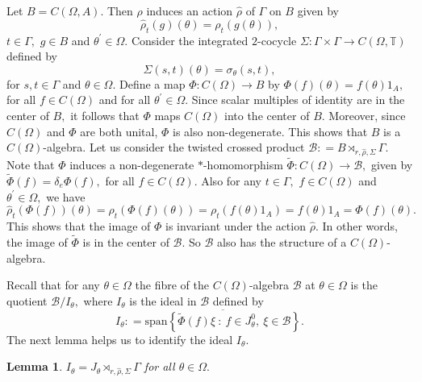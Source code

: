\documentclass[a4paper,11pt,reqno]{amsart}
\theoremstyle{plain}
\newtheorem{lem}[thm]{Lemma}
\theoremstyle{mainthmstyle}
\theoremstyle{named}
\numberwithin{equation}{section}
\begin{document}
Let $B = C (\Omega, A).$ Then $\rho$ induces an action $\hat {\rho}$ of $\Gamma$ on $B$ given by $$\hat {\rho}_t (g) (\theta) = \rho_t (g (\theta)),$$ $t \in \Gamma,$ $g \in B$ and $\theta^{\prime} \in \Omega.$ Consider the integrated $2$-cocycle $\Sigma : \Gamma \times \Gamma \rightarrow C (\Omega, \mathbb T)$ defined by $$\Sigma (s, t) (\theta) = \sigma_{\theta} (s, t),$$ for $s, t \in \Gamma$ and $\theta \in \Omega.$ Define a map $\Phi : C (\Omega) \rightarrow B$ by $\Phi (f) (\theta) = f (\theta) 1_A,$ for all $f \in C (\Omega)$ and for all $\theta^{\prime} \in \Omega.$ Since scalar multiples of identity are in the center of $B,$ it follows that $\Phi$ maps $C (\Omega)$ into the center of $B.$ Moreover, since $C (\Omega)$ and $\Phi$ are both unital, $\Phi$ is also non-degenerate. This shows that $B$ is a $C (\Omega)$-algebra. Let us consider the twisted crossed product $\mathcal B : = B \rtimes_{r, \hat {\rho}, \Sigma} \Gamma.$ Note that $\Phi$ induces a non-degenerate $\ast$-homomorphism $\tilde {\Phi} : C (\Omega) \rightarrow \mathcal B,$ given by $\tilde {\Phi} (f) = \delta_e \Phi (f),$ for all $f \in C (\Omega).$ Also for any $t \in \Gamma,$ $f \in C (\Omega)$ and $\theta^{\prime} \in \Omega,$ we have 
$$\hat {\rho}_t (\Phi (f)) (\theta) = \rho_t (\Phi (f) (\theta)) = \rho_t (f (\theta) 1_A) = f (\theta) 1_A = \Phi (f) (\theta).$$
This shows that the image of $\Phi$ is invariant under the action $\hat {\rho}.$ In other words, the image of $\tilde {\Phi}$ is in the center of $\mathcal B.$ So $\mathcal B$ also has the structure of a $C (\Omega)$-algebra. 

Recall that for any $\theta \in \Omega$ the fibre of the $C(\Omega)$-algebra $\mathcal{B}$ at $\theta\in\Omega$ is the quotient $\mathcal{B}/I_{\theta},$ where $I_{\theta}$ is the ideal in $\mathcal{B}$ defined by 
$$I_{\theta} : = \overline {\mathrm {span} \left \{\tilde {\Phi} (f) \xi\ :\ f \in J_{\theta}^{0},\ \xi \in \mathcal B \right \}}.$$
The next lemma helps us to identify the ideal $I_{\theta}$.
\begin{lem}\label{Itheta}
$I_{\theta} = J_{\theta} \rtimes_{r, \hat {\rho},\Sigma} \Gamma$ for all $\theta \in \Omega.$
\end{lem}
\end{document}
